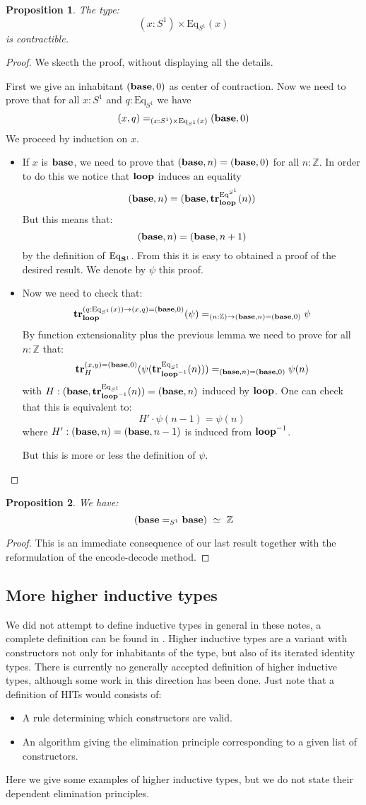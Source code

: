 \documentclass{article}
\newcommand{\sse}[1]{\medbreak \subsection{#1}}
\renewcommand{\r}{\rightarrow}
\newcommand{\tr}{\mathrm{\bf tr}}
\newcommand{\base}{\mathrm{\bf base}}
\renewcommand{\loop}{\mathrm{\bf loop}}
\renewcommand{\S}{\mathrm{\bf S}}
\newcommand{\Eq}{\mathrm{Eq}}
\newtheorem{proposition}{Proposition}
\begin{document}
\begin{proposition}
The type:
\[(x:S^1)\times \Eq_{S^1}(x)\]
is contractible.
\end{proposition}
\begin{proof}
We skecth the proof, without displaying all the details.

First we give an inhabitant $(\base,0)$ as center of contraction. Now we need to prove that for all $x:S^1$ and $q:\Eq_{S^1}$ we have 
\[(x,q) =_{(x:S^1)\times \Eq_{S^1}(x)} (\base,0)\]
We proceed by induction on $x$.
\begin{itemize}
\item If $x$ is $\base$, we need to prove that $(\base,n)=(\base,0)$ for all $n:\mathbb{Z}$. In order to do this we notice that $\loop$ induces an equality 
\[(\base,n) = (\base,\tr^{\Eq^{S^1}}_\loop(n))\]
But this means that:
\[(\base,n)=(\base,n+1)\]
by the definition of $\Eq_{\S^1}$. From this it is easy to obtained a proof of the desired result. We denote by $\psi$ this proof.
\item Now we need to check that: 
\[\tr^{(q:\Eq_{S^1}(x)) \r (x,q)=(\base,0)}_\loop(\psi) =_{(n:\mathbb{Z}) \r (\base,n) = (\base,0)} \psi \]
By function extensionality plus the previous lemma we need to prove for all $n:\mathbb{Z}$ that:
\[\tr^{(x,y)=(\base,0)}_H(\psi(\tr^{\Eq_{S^1}}_{\loop^{-1}}(n))) =_{(\base,n)=(\base,0)} \psi(n)\]
with $H : (\base,\tr^{\Eq_{S^1}}_{\loop^{-1}}(n)) = (\base,n)$ induced by $\loop$. One can check that this is equivalent to:
\[H'\cdot \psi(n-1) = \psi(n)\]
where $H' : (\base,n) = (\base,n-1)$ is induced from $\loop^{-1}$.

But this is more or less the definition of $\psi$.
\end{itemize}
\end{proof}

\begin{proposition}
We have: 
\[(\base=_{S^1}\base) \ \simeq \ \mathbb{Z}\]
\end{proposition}
\begin{proof}
This is an immediate consequence of our last result together with the reformulation of the encode-decode method.
\end{proof}


\sse{More higher inductive types}

We did not attempt to define inductive types in general in these notes, a complete definition can be found in \cite{dybjer1994inductive}. Higher inductive types are a variant with constructors not only for inhabitants of the type, but also of its iterated identity types. There is currently no generally accepted definition of higher inductive types, although some work in this direction has been done. Just note that a definition of HITs would consists of:
\begin{itemize}
\item A rule determining which constructors are valid.
\item An algorithm giving the elimination principle corresponding to a given list of constructors.
\end{itemize}
Here we give some examples of higher inductive types, but we do not state their dependent elimination principles.
\end{document}
